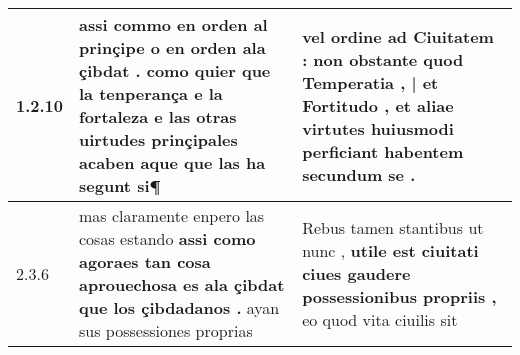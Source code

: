 \begin{tabular}{|p{1cm}|p{6.5cm}|p{6.5cm}|}

\hline
1.2.10 & assi commo en orden al prinçipe o en orden ala çibdat . \textbf{ como quier que la tenperança e la fortaleza e las otras uirtudes prinçipales acaben } aque que las ha segunt si¶ & vel ordine ad Ciuitatem : \textbf{ non obstante quod Temperatia , | et Fortitudo , } et aliae virtutes huiusmodi perficiant habentem secundum se . \\\hline
2.3.6 & mas claramente enpero las cosas estando \textbf{ assi como agoraes tan cosa aprouechosa es ala çibdat que los çibdadanos . } ayan sus possessiones proprias & Rebus tamen stantibus ut nunc , \textbf{ utile est ciuitati ciues gaudere possessionibus propriis , } eo quod vita ciuilis sit \\\hline

\end{tabular}
